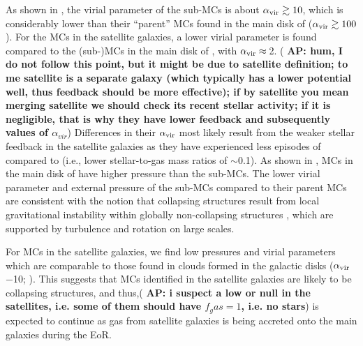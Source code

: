 \IfFileExists{emulateapjlegacy.cls}{\documentclass[iop]{emulateapjlegacy}}{\documentclass[iop]{emulateapj}}
\newcommand{\AP}[1]{({\bf \color{apcolor} AP: #1})}
\newcommand{\DL}[1]{({\bf \color{dlcolor} DL: #1})}
\begin{document}

As shown in , the virial parameter of the sub-MCs is about $\alpha_{\rm vir}\gtrsim10$, which is considerably lower than their ``parent'' MCs found in the main disk of \flower ($\alpha_{\rm vir}\gtrsim100$).
%
For the MCs in the satellite galaxies, a lower virial parameter is found compared to the (sub-)MCs in the main disk of \flower, with $\alpha_{\rm vir}\approx$\,2.
\AP{hum, I do not follow this point, but it might be due to satellite definition; to me satellite is a separate galaxy (which typically has a lower potential well, thus feedback should be more effective); if by satellite you mean merging satellite we should check its recent stellar activity; if it is negligible, that is why they have lower feedback and subsequently values of $\alpha_{vir}$} Differences in their $\alpha_{\rm vir}$ most likely result from the weaker stellar feedback in the satellite galaxies as they have experienced less episodes of \SF compared to \flower (i.e., lower stellar-to-gas mass ratios of $\sim$0.1).
As shown in , MCs in the main disk of \flower have higher pressure than the sub-MCs. The lower virial parameter and external pressure of the sub-MCs compared to their parent MCs are consistent with the notion that collapsing structures result from local gravitational instability within globally non-collapsing structures \citep[see e.g.,][]{Ballesteros-Paredes11a}, which are supported by turbulence and rotation on large scales.

For MCs in the satellite galaxies, we find low pressures and virial parameters  which are comparable to those found in clouds formed in the galactic disks  ($\alpha_{\rm vir}$$-$10; \citealt{Dobbs08a, Tasker09a}).
This suggests that MCs identified in the satellite galaxies are likely to be collapsing structures, and thus,\AP{i suspect a low or null \SF in the satellites, i.e. some of them should have $f_gas = 1$, i.e. no stars} \SF is expected to continue as gas from satellite galaxies is being accreted onto the main galaxies during the EoR.
\end{document}
